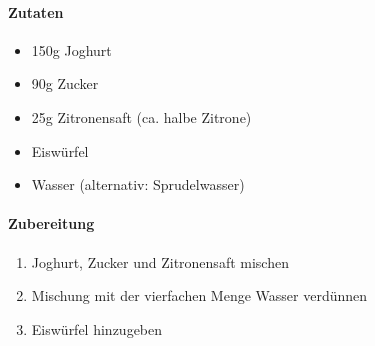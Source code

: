 \clearpage
{}
\label{Calpis}

\paragraph{Zutaten}
\begin{itemize}[noitemsep]
	\item 150g Joghurt
	\item 90g Zucker
	\item 25g Zitronensaft (ca. halbe Zitrone)
	\item Eiswürfel
	\item Wasser (alternativ: Sprudelwasser)
\end{itemize}

\paragraph{Zubereitung}
\begin{enumerate}
	\item Joghurt, Zucker und Zitronensaft mischen
	\item Mischung mit der vierfachen Menge Wasser verdünnen
	\item Eiswürfel hinzugeben
\end{enumerate}